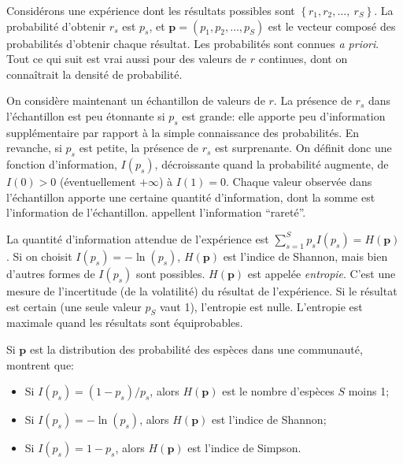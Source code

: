 \documentclass[
  11pt,
  french,
  a4paper,
  extrafontsizes,onecolumn,openright
  ]{memoir}
\providecommand{\tightlist}{%
  \setlength{\itemsep}{0pt}\setlength{\parskip}{0pt}}
\begin{document}
Considérons une expérience dont les résultats possibles sont \(\left\{r_1,r_2,\dots ,\ r_S\right\}\).
La probabilité d'obtenir \(r_s\) est \(p_s\), et \(\mathbf{p}=(p_1,p_2,\dots,p_S)\) est le vecteur composé des probabilités d'obtenir chaque résultat.
Les probabilités sont connues \emph{a priori}.
Tout ce qui suit est vrai aussi pour des valeurs de \(r\) continues, dont on connaîtrait la densité de probabilité.

On considère maintenant un échantillon de valeurs de \(r\).
La présence de \(r_s\) dans l'échantillon est peu étonnante si \(p_s\) est grande: elle apporte peu d'information supplémentaire par rapport à la simple connaissance des probabilités.
En revanche, si \(p_s\) est petite, la présence de \(r_s\) est surprenante.
On définit donc une fonction d'information, \(I(p_s)\), décroissante quand la probabilité augmente, de \(I(0)>0\) (éventuellement \(+\infty\)) à \(I(1)=0\).
Chaque valeur observée dans l'échantillon apporte une certaine quantité d'information, dont la somme est l'information de l'échantillon.
\textcite{Patil1982} appellent l'information ``rareté''.

La quantité d'information attendue de l'expérience est \(\sum^S_{s=1}{p_s I(p_s) = H(\mathbf{p})}\).
Si on choisit \(I\left(p_s\right)=-\ln\left(p_s\right)\), \(H\left(\mathbf{p}\right)\) est l'indice de Shannon, mais bien d'autres formes de \(I\left(p_s\right)\) sont possibles.
\(H\left(\mathbf{p}\right)\) est appelée \emph{entropie}.
C'est une mesure de l'incertitude (de la volatilité) du résultat de l'expérience.
Si le résultat est certain (une seule valeur \(p_S\) vaut 1), l'entropie est nulle.
L'entropie est maximale quand les résultats sont équiprobables.

Si \(\mathbf{p}\) est la distribution des probabilité des espèces dans une communauté, \textcite{Patil1982} montrent que:

\begin{itemize}
\tightlist
\item
  Si \(I\left(p_s\right) = (1-p_s)/{p_s}\), alors \(H\left(\mathbf{p}\right)\) est le nombre d'espèces \(S\) moins 1;
\item
  Si \(I\left(p_s\right)=-\ln\left(p_s\right)\), alors \(H\left(\mathbf{p}\right)\) est l'indice de Shannon;
\item
  Si \(I\left(p_s\right)=1-p_s\), alors \(H\left(\mathbf{p}\right)\) est l'indice de Simpson.
\end{itemize}
\end{document}
